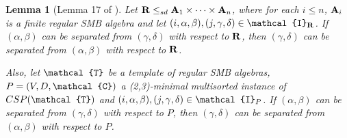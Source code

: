 \documentclass[11pt]{amsart}
\newcommand{\m}[1]{{\uppercase {\mathbf {#1}}}}
\newcommand{\vr}[1]{{\uppercase {\mathcal{#1}}}}
\newtheorem{lm}[thm]{Lemma}
\theoremstyle{definition}
\begin{document}
\begin{lm}[Lemma 17 of \cite{BuSMB}]\label{sepissymmetric}
Let $\m R\leq_{sd}\m a_1\times\dots\times\m a_n$, where for each $i\leq n$, $\m a_i$ is a finite regular SMB algebra and let $(i,\alpha,\beta),(j,\gamma,\delta)\in\vr i_{\m r}$. If $(\alpha,\beta)$ can be separated from $(\gamma,\delta)$ with respect to $\m r$, then $(\gamma,\delta)$ can be separated from $(\alpha,\beta)$ with respect to $\m r$.

Also, let $\vr t$ be a template of regular SMB algebras, $P=(V,D,\vr c)$ a (2,3)-minimal multisorted instance of $CSP(\vr t)$ and $(i,\alpha,\beta),(j,\gamma,\delta)\in\vr i_P$. If $(\alpha,\beta)$ can be separated from $(\gamma,\delta)$ with respect to $P$, then $(\gamma,\delta)$ can be separated from $(\alpha,\beta)$ with respect to $P$.
\end{lm}
\end{document}

